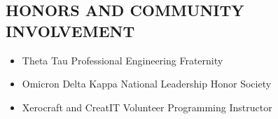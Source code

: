 \documentclass{res}
\begin{document}
\begin{resume}
\section{HONORS AND COMMUNITY INVOLVEMENT}
  \begin{itemize} \itemsep -2pt %
    \item Theta Tau Professional Engineering Fraternity
    \item Omicron Delta Kappa National Leadership Honor Society
    \item Xerocraft and CreatIT Volunteer Programming Instructor
  \end{itemize}


\end{resume}
\end{document}
